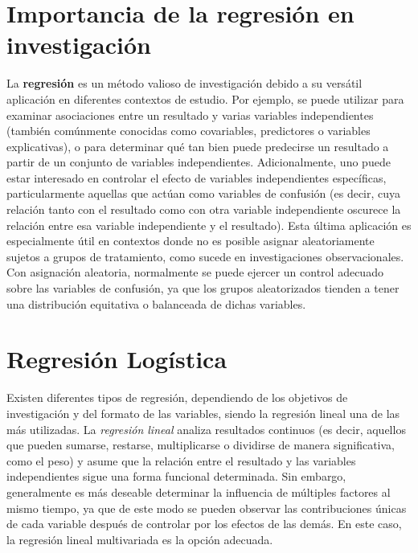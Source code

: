 \documentclass[12pt]{article}
\begin{document}
\section{Importancia de la regresi\'on en investigaci\'on}

La \textbf{regresi\'on} es un m\'etodo valioso de investigaci\'on debido a su vers\'atil aplicaci\'on en diferentes contextos de estudio. Por ejemplo, se puede utilizar para examinar asociaciones entre un resultado y varias variables independientes (tambi\'en com\'unmente conocidas como covariables, predictores o variables explicativas)\cite{darlington1990}, o para determinar qu\'e tan bien puede predecirse un resultado a partir de un conjunto de variables independientes\cite{darlington1990,tabachnick2007}. Adicionalmente, uno puede estar interesado en controlar el efecto de variables independientes espec\'ificas, particularmente aquellas que act\'uan como variables de confusi\'on (es decir, cuya relaci\'on tanto con el resultado como con otra variable independiente oscurece la relaci\'on entre esa variable independiente y el resultado)\cite{darlington1990,hosmer2000}. Esta \'ultima aplicaci\'on es especialmente \'util en contextos donde no es posible asignar aleatoriamente sujetos a grupos de tratamiento, como sucede en investigaciones observacionales. Con asignaci\'on aleatoria, normalmente se puede ejercer un control adecuado sobre las variables de confusi\'on, ya que los grupos aleatorizados tienden a tener una distribuci\'on equitativa o balanceada de dichas variables\cite{campbell1963}.

\section{Regresi\'on Log\'istica}

Existen diferentes tipos de regresi\'on, dependiendo de los objetivos de investigaci\'on y del formato de las variables, siendo la regresi\'on lineal una de las m\'as utilizadas. La \textit{regresi\'on lineal} analiza resultados continuos (es decir, aquellos que pueden sumarse, restarse, multiplicarse o dividirse de manera significativa, como el peso) y asume que la relaci\'on entre el resultado y las variables independientes sigue una forma funcional determinada. Sin embargo, generalmente es m\'as deseable determinar la influencia de m\'ultiples factores al mismo tiempo, ya que de este modo se pueden observar las contribuciones \'unicas de cada variable despu\'es de controlar por los efectos de las dem\'as. En este caso, la regresi\'on lineal multivariada es la opci\'on adecuada.
\end{document}
